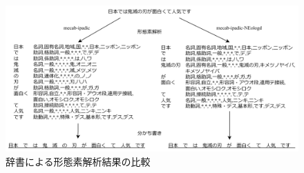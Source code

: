 \documentclass{ltjarticle}
\begin{document}
\begin{figure}[h]
    \centering
    \includegraphics[width = 14.6cm]{images/形態素解析.drawio.png}
    \caption{辞書による形態素解析結果の比較}
    \label{fig:形態素解析}
\end{figure}

\newpage
\end{document}
